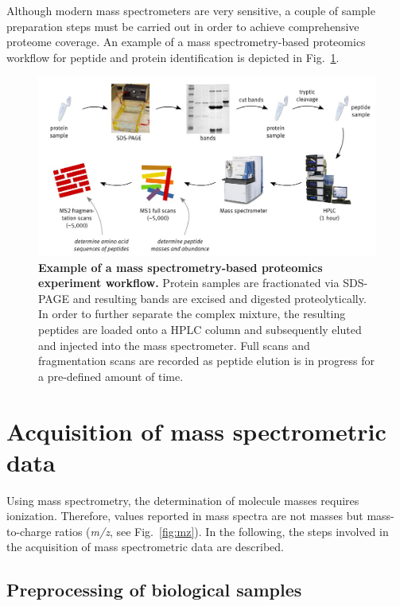 Although modern mass spectrometers are very sensitive, a couple of sample 
preparation steps must be carried out in order to achieve comprehensive 
proteome coverage. 
An example of a mass spectrometry-based proteomics workflow for peptide 
and protein identification is depicted in Fig.~\ref{fig:proteomics-overview}.

\begin{figure}
\includegraphics[width=\textwidth]{figures/Proteomics.jpg}
\caption{
{\bf Example of a mass spectrometry-based proteomics experiment workflow.} 
Protein samples are fractionated via SDS-PAGE and resulting bands are excised and
digested proteolytically. In order to further separate the complex mixture, 
the resulting peptides are loaded onto a HPLC column and subsequently eluted 
and injected into the mass spectrometer. Full scans and fragmentation scans
are recorded as peptide elution is in progress for a pre-defined amount of time.
}
\label{fig:proteomics-overview}
\end{figure}

\section{Acquisition of mass spectrometric data}

Using mass spectrometry, the determination of molecule masses requires 
ionization.
Therefore, values reported in mass spectra are not masses but mass-to-charge 
ratios ({\em m/z}, see Fig.~\ref{fig:mz}).
In the following, the steps involved in the acquisition of mass spectrometric
data are described.

\subsection{Preprocessing of biological samples}

